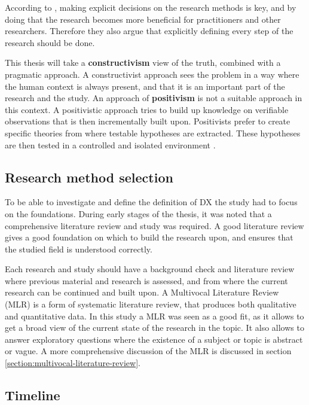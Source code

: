\documentclass[english, 12pt, a4paper, sci, utf8, a-1b, online]{aaltothesis}
\begin{document}
According to \textcite{easterbrook2008selecting}, making explicit decisions on the research methods is key, and by doing that the research becomes more beneficial for practitioners and other researchers. Therefore they also argue that explicitly defining every step of the research should be done.

This thesis will take a \textbf{constructivism} view of the truth, combined with a pragmatic approach. A constructivist approach sees the problem in a way where the human context is always present, and that it is an important part of the research and the study. An approach of \textbf{positivism} is not a suitable approach in this context. A positivistic approach tries to build up knowledge on verifiable observations that is then incrementally built upon. Positivists prefer to create specific theories from where testable hypotheses are extracted. These hypotheses are then tested in a controlled and isolated environment \parencite{easterbrook2008selecting}.

\subsection{Research method selection}

To be able to investigate and define the definition of DX the study had to focus on the foundations. During early stages of the thesis, it was noted that a comprehensive literature review and study was required. A good literature review gives a good foundation on which to build the research upon, and ensures that the studied field is understood correctly.

Each research and study should have a background check and literature review where previous material and research is assessed, and from where the current research can be continued and built upon. A Multivocal Literature Review (MLR) is a form of systematic literature review, that produces both qualitative and quantitative data. In this study a MLR was seen as a good fit, as it allows to get a broad view of the current state of the research in the topic. It also allows to answer exploratory questions where the existence of a subject or topic is abstract or vague. A more comprehensive discussion of the MLR is discussed in section \ref{section:multivocal-literature-review}.

\subsection{Timeline}
\end{document}
